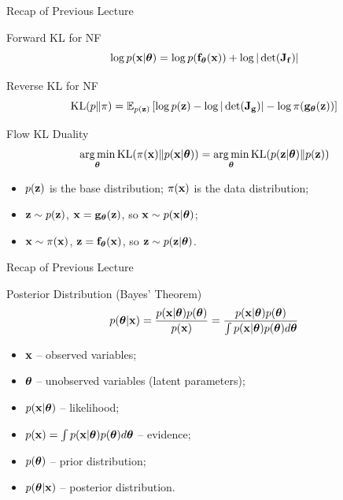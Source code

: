 \documentclass{beamer}
\begin{document}
\begin{frame}
	\titlepage
	\resetonslide
\end{frame}
\begin{frame}{Recap of Previous Lecture}
	\begin{block}{Forward KL for NF}
	  	\vspace{-0.1cm}
		\[
			\log p(\mathbf{x}|\boldsymbol{\theta}) = \log p(\mathbf{f}_{\boldsymbol{\theta}}(\mathbf{x})) + \log  |\det (\mathbf{J}_{\mathbf{f}})|
		\]
		\vspace{-0.3cm}
	\end{block}
	\begin{block}{Reverse KL for NF}
  		\vspace{-0.1cm}
		\[
			\mathrm{KL}(p \| \pi)  = \mathbb{E}_{p(\mathbf{z})} \left[  \log p(\mathbf{z}) -  \log |\det (\mathbf{J}_{\mathbf{g}})| - \log \pi(\mathbf{g}_{\boldsymbol{\theta}}(\mathbf{z})) \right]
		\]
		\vspace{-0.5cm}
	\end{block}
	\begin{block}{Flow KL Duality}
	  	\vspace{-0.3cm}
		\[
			\operatorname*{arg\,min}_{\boldsymbol{\theta}} \mathrm{KL}(\pi(\mathbf{x}) \| p(\mathbf{x} | \boldsymbol{\theta})) = \operatorname*{arg\,min}_{\boldsymbol{\theta}} \mathrm{KL}(p(\mathbf{z} | \boldsymbol{\theta}) \| p(\mathbf{z}))
		\]
		\vspace{-0.3cm}
		\begin{itemize}
			\item $p(\mathbf{z})$ is the base distribution; $\pi(\mathbf{x})$ is the data distribution;
			\item $\mathbf{z} \sim p(\mathbf{z})$, $\mathbf{x} = \mathbf{g}_{\boldsymbol{\theta}}(\mathbf{z})$, so $\mathbf{x} \sim p(\mathbf{x}| \boldsymbol{\theta})$;
			\item $\mathbf{x} \sim \pi(\mathbf{x})$, $\mathbf{z} = \mathbf{f}_{\boldsymbol{\theta}}(\mathbf{x})$, so $\mathbf{z} \sim p(\mathbf{z} | \boldsymbol{\theta})$.
		\end{itemize}
	\end{block}
\end{frame}
\begin{frame}{Recap of Previous Lecture}
	\begin{block}{Posterior Distribution (Bayes' Theorem)}
		\[
			p(\boldsymbol{\theta} | \mathbf{x}) = \frac{p(\mathbf{x} | \boldsymbol{\theta}) p(\boldsymbol{\theta})}{p(\mathbf{x})} = \frac{p(\mathbf{x} | \boldsymbol{\theta}) p(\boldsymbol{\theta})}{\int p(\mathbf{x} | \boldsymbol{\theta}) p(\boldsymbol{\theta}) d \boldsymbol{\theta}} 
		\]
		\begin{itemize}
			\item $\mathbf{x}$ -- observed variables;
			\item $\boldsymbol{\theta}$ -- unobserved variables (latent parameters);
			\item $p(\mathbf{x} | \boldsymbol{\theta})$ -- likelihood;
			\item $p(\mathbf{x}) = \int p(\mathbf{x} | \boldsymbol{\theta}) p(\boldsymbol{\theta}) d \boldsymbol{\theta}$ -- evidence;
			\item $p(\boldsymbol{\theta})$ -- prior distribution;
			\item $p(\boldsymbol{\theta} | \mathbf{x})$ -- posterior distribution.
		\end{itemize}
	\end{block}
\end{frame}
\end{document}

